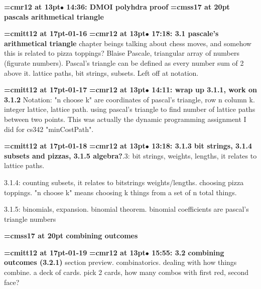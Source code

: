 {\smallskip\noindent\bf\font\titlefont=cmr12 at 13pt\titlefont $\bullet$ 14:36: DMOI polyhdra proof}\smallskip
{}
{\medskip\noindent\bf\font\titlefont=cmss17 at 20pt pascals arithmetical triangle}\medskip

{\medskip\noindent\bf\font\titlefont=cmitt12 at 17pt-01-16}\medskip
{\smallskip\noindent\bf\font\titlefont=cmr12 at 13pt\titlefont $\bullet$ 17:18: 3.1 pascale's arithmetical triangle}\smallskip
chapter beings talking about chess moves, and somehow this is related to pizza toppings? Blaise Pascale, triangular array of numbers (figurate numbers). Pascal's triangle can be defined as every number sum of 2 above it. lattice paths, bit strings, subsets. Left off at notation.
\par

{\medskip\noindent\bf\font\titlefont=cmitt12 at 17pt-01-17}\medskip
{\smallskip\noindent\bf\font\titlefont=cmr12 at 13pt\titlefont $\bullet$ 14:11: wrap up 3.1.1, work on 3.1.2}\smallskip
Notation: "n choose k" are coordinates of pascal's triangle, row n column k. integer lattice, lattice path. using pascal's triangle to find number of lattice paths between two points. This was actually the dynamic programming assignment I did for cs342 "minCostPath".
\par

{\medskip\noindent\bf\font\titlefont=cmitt12 at 17pt-01-18}\medskip
{\smallskip\noindent\bf\font\titlefont=cmr12 at 13pt\titlefont $\bullet$ 13:18: 3.1.3 bit strings, 3.1.4 subsets and pizzas, 3.1.5 algebra?}.3: bit strings, weights, lengths, it relates to lattice paths.
\par

3.1.4: counting subsets, it relates to bitstrings weights/lengths. choosing pizza toppings. "n choose k" means choosing k things from a set of n total things.
\par

3.1.5: binomials, expansion. binomial theorem. binomial coefficients are pascal's triangle numbers
\par

{\medskip\noindent\bf\font\titlefont=cmss17 at 20pt combining outcomes}\medskip

{\medskip\noindent\bf\font\titlefont=cmitt12 at 17pt-01-19}\medskip
{\smallskip\noindent\bf\font\titlefont=cmr12 at 13pt\titlefont $\bullet$ 15:55: 3.2 combining outcomes (3.2.1)}\smallskip
section preview. combinatorics. dealing with how things combine. a deck of cards. pick 2 cards, how many combos with first red, second face?
\par

